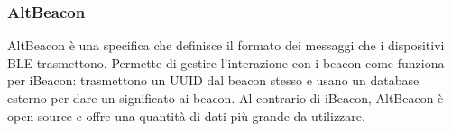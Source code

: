 \subsubsection{AltBeacon}
	AltBeacon è una specifica che definisce il formato dei messaggi che i dispositivi BLE trasmettono. Permette di gestire l'interazione con i beacon come funziona per iBeacon: trasmettono un UUID dal beacon stesso e usano un database esterno per dare un significato ai beacon.
	Al contrario di iBeacon, AltBeacon è open source e offre una quantità di dati più grande da utilizzare.
	
	
	
	
	